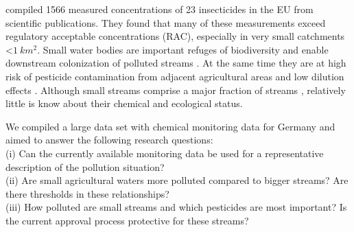\documentclass[journal=esthag,manuscript=article]{achemso}
\begin{document}
\citet{stehle_pesticide_2015} compiled 1566 measured concentrations of 23 insecticides in the EU from scientific publications. 
They found that many of these measurements exceed regulatory acceptable concentrations (RAC), especially in very small catchments \textless $1~km^2$.
Small water bodies are important refuges of biodiversity \citep{davies_comparison_2008} and enable downstream colonization of polluted streams \citep{liess_analyzing_2005}.
%
%
At the same time they are at high risk of pesticide contamination from adjacent agricultural areas and low dilution effects \citep{liess_determination_1999}.
%
%
%
%
Although small streams comprise a major fraction of streams \citep{nadeau_hydrological_2007}, relatively little is know about their chemical and ecological status.
%
%

We compiled a large data set with chemical monitoring data for Germany and aimed to answer the following research questions: \\
(i) Can the currently available monitoring data be used for a representative description of the pollution situation? \\
(ii) Are small agricultural waters more polluted compared to bigger streams? Are there thresholds in these relationships? \\
%
%
%
%
(iii) How polluted are small streams and which pesticides are most important? Is the current approval process protective for these streams?  
%
%
\end{document}
